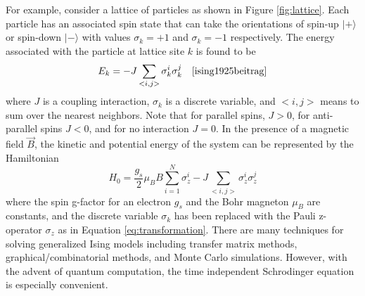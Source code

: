 For example, consider a lattice of particles as shown in Figure \ref{fig:lattice}. 
Each particle has an associated spin state that can take the orientations of spin-up $|+\rangle$ or spin-down $|-\rangle$ with values $\sigma_k = +1$ and $\sigma_k = -1$ respectively. The energy associated with the particle at lattice site $k$ is found to be 
\begin{equation}
	E_k= - J\sum_{<i,j>}\sigma_k^i\sigma_k^j \quad \cite{ising1925beitrag}
	\label{eq:latticeSiteEnergy}
\end{equation}
where $J$ is a coupling interaction, $\sigma_k$ is a discrete variable, and $<i,j>$ means to sum over the nearest neighbors. Note that for parallel spins, $J>0$, for anti-parallel spins $J<0$, and for no interaction $J = 0$. 
In the presence of a magnetic field $\vec{B}$, the kinetic and potential energy of the system can be represented by the Hamiltonian
\begin{equation}
	H_0 = \frac{g_s}{2}\mu_B B\sum_{i=1}^N \sigma_z^i - J\sum_{<i,j>}\sigma_z^i\sigma_z^j
	\label{eq:isingHamiltonian}
\end{equation} 
where the spin g-factor for an electron $g_s$ and the Bohr magneton $\mu_B$ are constants, and the discrete variable $\sigma_k$ has been replaced with the Pauli z-operator $\sigma_z$ as in Equation \ref{eq:transformation}. 
There are many techniques for solving generalized Ising models including transfer matrix methods\cite{onsager1944crystal}, graphical/combinatorial methods\cite{feynman1972statistical}, and Monte Carlo simulations\cite{schroeder2011thermal}. 
However, with the advent of quantum computation, the time independent Schrodinger equation is especially convenient.